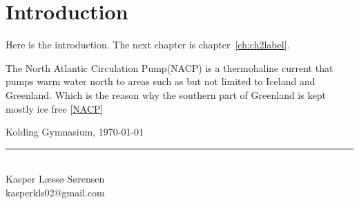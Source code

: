 \chapter{Introduction}\label{ch:introduction}
Here is the introduction. The next chapter is chapter~\ref{ch:ch2label}.


The North Atlantic Circulation Pump\label{NACP}(NACP) is a thermohaline current that pumps warm water north to areas such as but not limited to Iceland and Greenland\cite{NASA_Thermohaline_Circulation}. Which is the reason why the southern part of Greenland is kept mostly ice free
\ref{NACP}

\vspace{\baselineskip}\hfill Kolding Gymnasium, \today
\vfill\noindent
\begin{center}
    

\begin{minipage}[b]{0.45\textwidth}
 \centering
 \rule{\textwidth}{0.5pt}\\
  Kasper Læssø Sørensen\\
 {\footnotesize kasperkls02@gmail.com}
\end{minipage}
\end{center}
